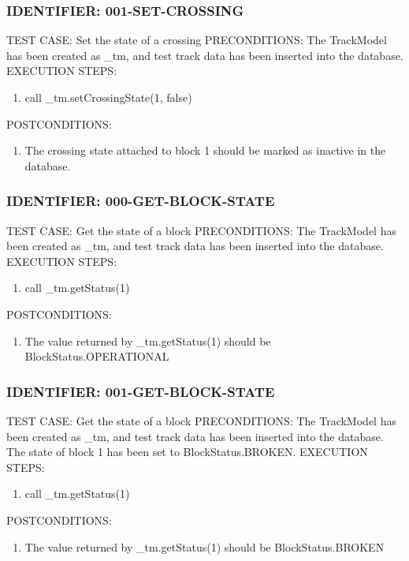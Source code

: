 \documentclass{scrreprt}
\begin{document}
\subsubsection{IDENTIFIER: 001-SET-CROSSING}
TEST CASE: Set the state of a crossing
PRECONDITIONS: The TrackModel has been created as _tm, and test track data has been inserted into the database.
EXECUTION STEPS:
\begin{enumerate}
	\item call _tm.setCrossingState(1, false)
\end{enumerate}
POSTCONDITIONS:
\begin{enumerate}
	\item The crossing state attached to block 1 should be marked as inactive in the database.
\end{enumerate}

\subsubsection{IDENTIFIER: 000-GET-BLOCK-STATE}
TEST CASE: Get the state of a block
PRECONDITIONS: The TrackModel has been created as _tm, and test track data has been inserted into the database.
EXECUTION STEPS:
\begin{enumerate}
	\item call _tm.getStatus(1)
\end{enumerate}
POSTCONDITIONS:
\begin{enumerate}
	\item The value returned by _tm.getStatus(1) should be BlockStatus.OPERATIONAL
\end{enumerate}

\subsubsection{IDENTIFIER: 001-GET-BLOCK-STATE}
TEST CASE: Get the state of a block
PRECONDITIONS: The TrackModel has been created as _tm, and test track data has been inserted into the database. The state of block 1 has been set to BlockStatus.BROKEN.
EXECUTION STEPS:
\begin{enumerate}
	\item call _tm.getStatus(1)
\end{enumerate}
POSTCONDITIONS:
\begin{enumerate}
	\item The value returned by _tm.getStatus(1) should be BlockStatus.BROKEN
\end{enumerate}
\end{document}
